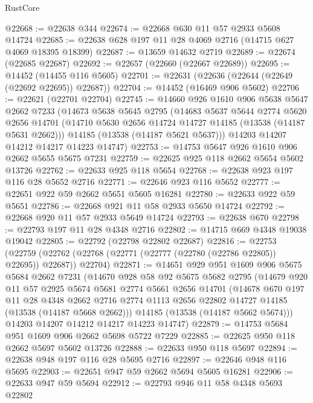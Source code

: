 \begin{lexlean}{RustCore}
\begin{coremodule}
@22668 := @22638 @344
@22674 := @22668 @630 @11 @57 @2933 @5608 @14724
@22685 := @22638 @628 @197 @11 @28 @4069 @2716 (@14715 @627 @4069 @18395 @18399)
@22687 := @13659 @14632 @2719
@22689 := @22674 (@22685 @22687)
@22692 := @22657 (@22660 (@22667 @22689))
@22695 := @14452 (@14455 @116 @5605)
@22701 := @22631 (@22636 (@22644 (@22649 (@22692 @22695)) @22687))
@22704 := @14452 (@16469 @906 @5602)
@22706 := @22621 (@22701 @22704)
@22745 := @14660
    @926
    @1610
    @906
    @5638
    @5647
    @2662
    @7233
    (@14673
      @5638
      @5645
      @2795
      (@14683
        @5637
        @5644
        @2774
        @5620
        @2656
        @14701
        (@14710 @5630 @2656 @14724 @14727 @14185 (@13538 (@14187 @5631 @2662)))
        @14185
        (@13538 (@14187 @5621 @5637)))
      @14203
      @14207
      @14212
      @14217
      @14223
      @14747)
@22753 := @14753 @5647 @926 @1610 @906 @2662 @5655 @5675 @7231
@22759 := @22625 @925 @118 @2662 @5654 @5602 @13726
@22762 := @22633 @925 @118 @5654
@22768 := @22638 @923 @197 @116 @28 @5652 @2716
@22771 := @22646 @923 @116 @5652
@22777 := @22651 @922 @59 @2662 @5651 @5605 @16281
@22780 := @22633 @922 @59 @5651
@22786 := @22668 @921 @11 @58 @2933 @5650 @14724
@22792 := @22668 @920 @11 @57 @2933 @5649 @14724
@22793 := @22638 @670
@22798 := @22793 @197 @11 @28 @4348 @2716
@22802 := @14715 @669 @4348 @19038 @19042
@22805 := @22792 (@22798 @22802 @22687)
@22816 := @22753
    (@22759 (@22762 (@22768 (@22771 (@22777 (@22780 (@22786 @22805)) @22695)) @22687)) @22704)
@22871 := @14651
    @929
    @951
    @1609
    @906
    @5675
    @5684
    @2662
    @7231
    (@14670
      @928
      @58
      @92
      @5675
      @5682
      @2795
      (@14679
        @920
        @11
        @57
        @2925
        @5674
        @5681
        @2774
        @5661
        @2656
        @14701
        (@14678
          @670
          @197
          @11
          @28
          @4348
          @2662
          @2716
          @2774
          @1113
          @2656
          @22802
          @14727
          @14185
          (@13538 (@14187 @5668 @2662)))
        @14185
        (@13538 (@14187 @5662 @5674)))
      @14203
      @14207
      @14212
      @14217
      @14223
      @14747)
@22879 := @14753 @5684 @951 @1609 @906 @2662 @5698 @5722 @7229
@22885 := @22625 @950 @118 @2662 @5697 @5602 @13726
@22888 := @22633 @950 @118 @5697
@22894 := @22638 @948 @197 @116 @28 @5695 @2716
@22897 := @22646 @948 @116 @5695
@22903 := @22651 @947 @59 @2662 @5694 @5605 @16281
@22906 := @22633 @947 @59 @5694
@22912 := @22793 @946 @11 @58 @4348 @5693 @22802

\end{coremodule}
\end{lexlean}
